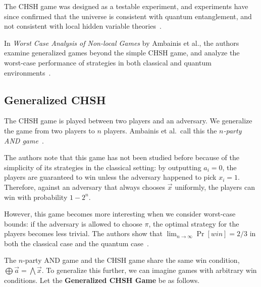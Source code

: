 The CHSH game was designed as a testable experiment, and experiments have since confirmed that the universe is consistent with quantum entanglement, and not consistent with local hidden variable theories~\cite{aspect}.

In \emph{Worst Case Analysis of Non-local Games} by Ambainis et al., the authors examine generalized games beyond the simple CHSH game, and analyze the worst-case performance of strategies in both classical and quantum environments~\cite{ABBSSV}.

\subsection{Generalized CHSH}

The CHSH game is played between two players and an adversary. We generalize the game from two players to $n$ players. Ambainis et al.~call this the \emph{$n$-party AND game}~\cite{ABBSSV}.

The authors note that this game has not been studied before because of the simplicity of its strategies in the classical setting: by outputting $a_i=0$, the players are guaranteed to win unless the adversary happened to pick $x_i=1$. Therefore, against an adversary that always chooses $\vec{x}$ uniformly, the players can win with probability $1-2^n$.

However, this game becomes more interesting when we consider worst-case bounds: if the adversary is allowed to choose $\pi$, the optimal strategy for the players becomes less trivial. The authors show that $\lim_{n \rightarrow \infty}\Pr[win] = 2/3$ in both the classical case and the quantum case~\cite{ABBSSV}.

The $n$-party AND game and the CHSH game share the same win condition, $\bigoplus \vec{a} = \bigwedge \vec{x}$. To generalize this further, we can imagine games with arbitrary win conditions. Let the \textbf{Generalized CHSH Game} be as follows.


